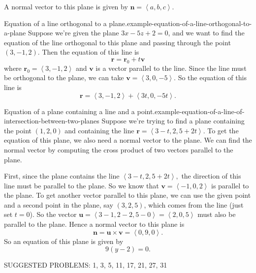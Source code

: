 \documentclass[10pt,]{book}
\numberwithin{equation}{section}
\newcommand{\vv}[1]{\mathbf{#1}}
\newcommand{\dotprod}[1]{\left\langle #1 \right\rangle}
\begin{document}
\hypertarget{p-1227}{}%
A normal vector to this plane is given by \(\vv{n} = \dotprod{a,b,c}\).%
\begin{example}{Equation of a line orthogonal to a plane.}{example-equation-of-a-line-orthogonal-to-a-plane}%
\hypertarget{p-1228}{}%
Suppose we're given the plane \(3x-5z+2 = 0\), and we want to find the equation of the line orthogonal to this plane and passing through the point \((3,-1,2)\). Then the equation of this line is%
%
\begin{equation*}
\vv{r} = \vv{r}_{0}+t\vv{v}
\end{equation*}
\hypertarget{p-1229}{}%
where \(\vv{r}_{0} = \dotprod{3,-1,2}\) and \(\vv{v}\) is a vector parallel to the line. Since the line must be orthogonal to the plane, we can take \(\vv{v} = \dotprod{3,0,-5}\). So the equation of this line is%
%
\begin{equation*}
\vv{r} = \dotprod{3,-1,2}+\dotprod{3t,0,-5t}.
\end{equation*}
\end{example}
\begin{example}{Equation of a plane containing a line and a point.}{example-equation-of-a-line-of-intersection-between-two-planes}%
\hypertarget{p-1230}{}%
Suppose we're trying to find a plane containing the point \((1,2,0)\) and containing the line \(\vv{r} = \dotprod{3-t,2,5+2t}\). To get the equation of this plane, we also need a normal vector to the plane. We can find the normal vector by computing the cross product of two vectors parallel to the plane.%
\par
\hypertarget{p-1231}{}%
First, since the plane contains the line \(\dotprod{3-t,2,5+2t},\) the direction of this line must be parallel to the plane. So we know that \(\vv{v} = \dotprod{-1,0,2}\) is parallel to the plane. To get another vector parallel to this plane, we can use the given point and a second point in the plane, say \((3,2,5)\), which comes from the line (just set \(t=0\)). So the vector \(\vv{u} = \dotprod{3-1,2-2,5-0} = \dotprod{2,0,5}\) must also be parallel to the plane. Hence a normal vector to this plane is%
%
\begin{equation*}
\vv{n} = \vv{u}\times\vv{v} = \dotprod{0,9,0}.
\end{equation*}
\hypertarget{p-1232}{}%
So an equation of this plane is given by%
%
\begin{equation*}
9(y-2) = 0.
\end{equation*}
\end{example}
\hypertarget{p-1233}{}%
SUGGESTED PROBLEMS: 1, 3, 5, 11, 17, 21, 27, 31%
%
%
\typeout{************************************************}
\typeout{************************************************}
%
\end{document}
